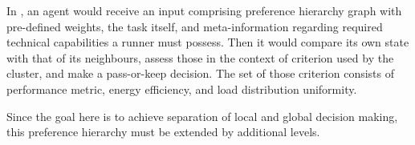 In \cite{murashov-2022}, an agent would receive an input comprising preference hierarchy graph with pre-defined weights, the task itself, and meta-information regarding required technical capabilities a runner must possess.
Then it would compare its own state with that of its neighbours, assess those in the context of criterion used by the cluster, and make a pass-or-keep decision.
The set of those criterion consists of performance metric, energy efficiency, and load distribution uniformity.

Since the goal here is to achieve separation of local and global decision making, this preference hierarchy must be extended by additional levels.
